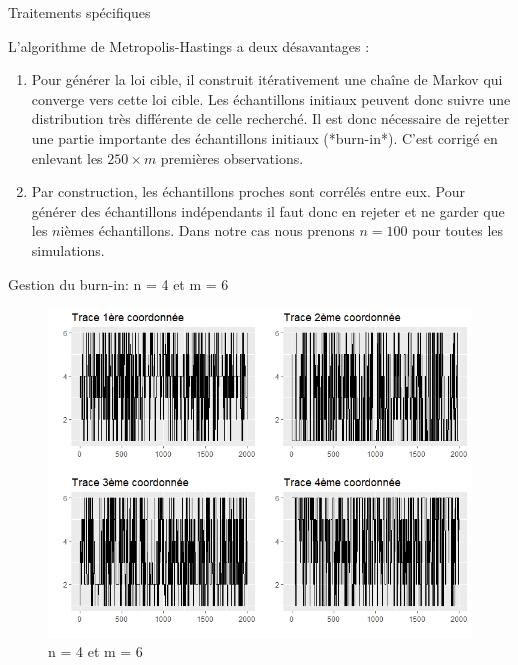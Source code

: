 \documentclass[10pt,xcolor=table,color={dvipsnames,usenames},ignorenonframetext,usepdftitle=false,french]{beamer}
\begin{document}
\begin{frame}{Traitements spécifiques}

L'algorithme de Metropolis-Hastings a deux désavantages :

\begin{enumerate}
\item Pour générer la loi cible, il construit itérativement une chaîne de Markov qui converge vers cette loi cible. Les échantillons initiaux peuvent donc suivre une distribution très différente de celle recherché. Il est donc nécessaire de rejetter une partie importante des échantillons initiaux (*burn-in*). C'est corrigé en enlevant les $250\times m$ premières observations.
\item  Par construction, les échantillons proches sont corrélés entre eux. Pour générer des échantillons indépendants il faut donc en rejeter et ne garder que les $n$ièmes échantillons. Dans notre cas nous prenons $n=100$ pour toutes les simulations.
\end{enumerate}

\end{frame}

\begin{frame}{Gestion du burn-in: n = 4 et m = 6}

\begin{figure}
\centering
\includegraphics{img/n_4_m_6.png}
\caption{n = 4 et m = 6}
\end{figure}

\end{frame}
\end{document}
